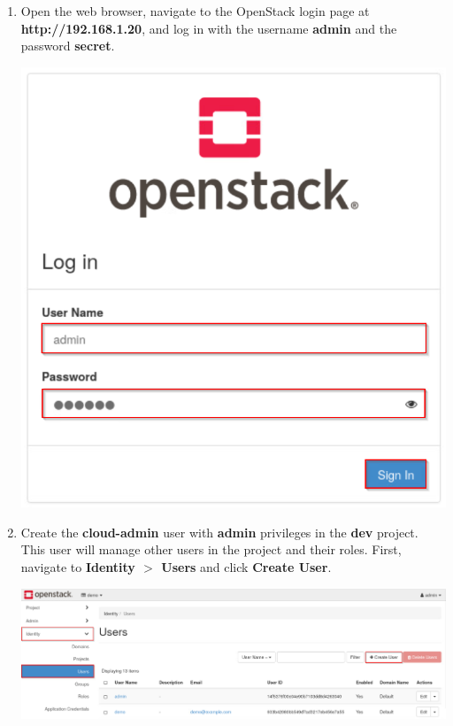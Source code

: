\documentclass[letterpaper, 12pt]{article}
\begin{document}
\begin{enumerate}
    \item Open the web browser, navigate to the OpenStack login page at \textbf{http://192.168.1.20}, and log in with
    the username \textbf{admin} and the password \textbf{secret}.

    \begin{center}
        \includegraphics[scale=0.5]{images/part3/step1.png}
    \end{center}

    \item Create the \textbf{cloud-admin} user with \textbf{admin} privileges in the \textbf{dev} project.
    This user will manage other users in the project and their roles.
    First, navigate to \textbf{Identity $>$ Users} and click \textbf{Create User}.

    \begin{center}
        \includegraphics[width=\linewidth]{images/part3/step2.png}
    \end{center}


\end{enumerate}
\end{document}
